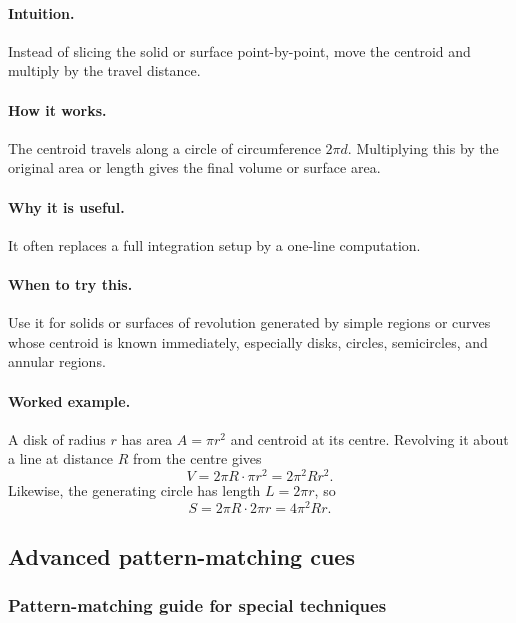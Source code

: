 \documentclass[12pt]{article}
\begin{document}
\paragraph{Intuition.}
Instead of slicing the solid or surface point-by-point, move the centroid and multiply by the travel distance.

\paragraph{How it works.}
The centroid travels along a circle of circumference \(2\pi d\). Multiplying this by the original area or length gives the final volume or surface area.

\paragraph{Why it is useful.}
It often replaces a full integration setup by a one-line computation.

\paragraph{When to try this.}
Use it for solids or surfaces of revolution generated by simple regions or curves whose centroid is known immediately, especially disks, circles, semicircles, and annular regions.

\paragraph{Worked example.}
A disk of radius \(r\) has area \(A=\pi r^2\) and centroid at its centre. Revolving it about a line at distance \(R\) from the centre gives
\[
V=2\pi R\cdot \pi r^2=2\pi^2 Rr^2.
\]
Likewise, the generating circle has length \(L=2\pi r\), so
\[
S=2\pi R\cdot 2\pi r=4\pi^2 Rr.
\]


\newpage
\subsection{Advanced pattern-matching cues}
\subsubsection{Pattern-matching guide for special techniques}
\end{document}

